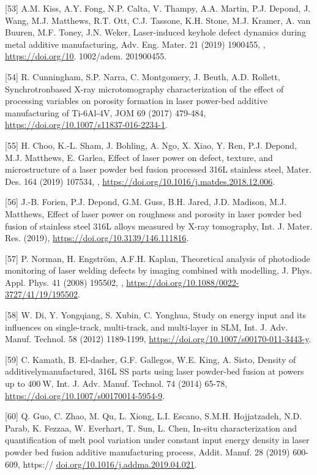 \documentclass[10pt]{article}
\begin{document}
[53] A.M. Kiss, A.Y. Fong, N.P. Calta, V. Thampy, A.A. Martin, P.J. Depond, J. Wang, M.J. Matthews, R.T. Ott, C.J. Tassone, K.H. Stone, M.J. Kramer, A. van Buuren, M.F. Toney, J.N. Weker, Laser-induced keyhole defect dynamics during metal additive manufacturing, Adv. Eng. Mater. 21 (2019) 1900455, , \href{https://doi.org/10}{https://doi.org/10}. 1002/adem. 201900455.

[54] R. Cunningham, S.P. Narra, C. Montgomery, J. Beuth, A.D. Rollett, Synchrotronbased X-ray microtomography characterization of the effect of processing variables on porosity formation in laser power-bed additive manufacturing of Ti-6Al-4V, JOM 69 (2017) 479-484, \href{https://doi.org/10.1007/s11837-016-2234-1}{https://doi.org/10.1007/s11837-016-2234-1}.

[55] H. Choo, K.-L. Sham, J. Bohling, A. Ngo, X. Xiao, Y. Ren, P.J. Depond, M.J. Matthews, E. Garlea, Effect of laser power on defect, texture, and microstructure of a laser powder bed fusion processed 316L stainless steel, Mater. Des. 164 (2019) 107534, , \href{https://doi.org/10.1016/j.matdes.2018.12.006}{https://doi.org/10.1016/j.matdes.2018.12.006}.

[56] J.-B. Forien, P.J. Depond, G.M. Guss, B.H. Jared, J.D. Madison, M.J. Matthews, Effect of laser power on roughness and porosity in laser powder bed fusion of stainless steel 316L alloys measured by X-ray tomography, Int. J. Mater. Res. (2019), \href{https://doi.org/10.3139/146.111816}{https://doi.org/10.3139/146.111816}.

[57] P. Norman, H. Engström, A.F.H. Kaplan, Theoretical analysis of photodiode monitoring of laser welding defects by imaging combined with modelling, J. Phys. Appl. Phys. 41 (2008) 195502, , \href{https://doi.org/10.1088/0022-3727/41/19/195502}{https://doi.org/10.1088/0022-3727/41/19/195502}.

[58] W. Di, Y. Yongqiang, S. Xubin, C. Yonghua, Study on energy input and its influences on single-track, multi-track, and multi-layer in SLM, Int. J. Adv. Manuf. Technol. 58 (2012) 1189-1199, \href{https://doi.org/10.1007/s00170-011-3443-y}{https://doi.org/10.1007/s00170-011-3443-y}.

[59] C. Kamath, B. El-dasher, G.F. Gallegos, W.E. King, A. Sisto, Density of additivelymanufactured, 316L SS parts using laser powder-bed fusion at powers up to $400 \mathrm{~W}$, Int. J. Adv. Manuf. Technol. 74 (2014) 65-78, \href{https://doi.org/10.1007/s00170014-5954-9}{https://doi.org/10.1007/s00170014-5954-9}.

[60] Q. Guo, C. Zhao, M. Qu, L. Xiong, L.I. Escano, S.M.H. Hojjatzadeh, N.D. Parab, K. Fezzaa, W. Everhart, T. Sun, L. Chen, In-situ characterization and quantification of melt pool variation under constant input energy density in laser powder bed fusion additive manufacturing process, Addit. Manuf. 28 (2019) 600-609, https:// \href{http://doi.org/10.1016/j.addma.2019.04.021}{doi.org/10.1016/j.addma.2019.04.021}.
\end{document}
